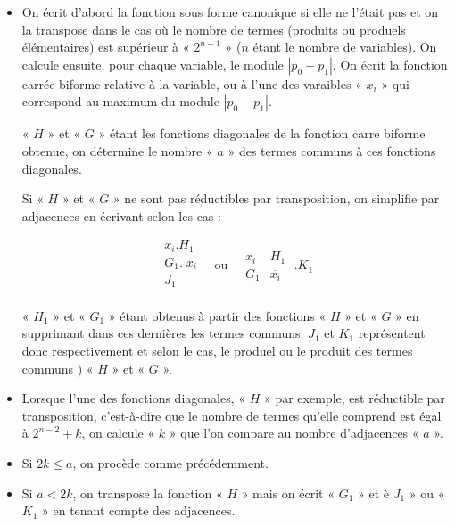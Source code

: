 \begin{itemize}
\item On écrit d'abord la fonction sous forme canonique si elle ne l'était pas et on la transpose dans le cas où le nombre de termes (produits ou produels élémentaires) est supérieur à « $2^{n-1}$ » ($n$ étant le nombre de variables). On calcule ensuite, pour chaque variable, le module $|p_0 - p_1|$. On écrit la fonction carrée biforme relative à la variable, ou à l'une des varaibles « $x_i$ » qui correspond au maximum du module $|p_0 - p_1|$.

« $H$ » et « $G$ » étant les fonctions diagonales de la fonction carre biforme obtenue, on détermine le nombre « $a$ » des termes communs à ces fonctions diagonales. 

Si « $H$ » et « $G$ » ne sont pas réductibles par transposition, on simplifie par adjacences en écrivant selon les cas : 



\[
\begin{array}{|c|} x_i . H_1 \\ G_1 . \; \overline{x_i} \\ J_1   \\    \end{array} \quad 
      \text{ou} \quad \begin{array}{|c|c|} x_i & H_1 \\ G_1 & \overline{x_i} \end{array} \; . K_1 
\]




« $H_1$ » et « $G_1$ » étant obtenus à partir des fonctions « $H$ » et « $G$ » en supprimant dans ces dernières les termes communs. $J_1$ et $K_1$ représentent donc respectivement et selon le cas, le produel ou le produit des termes communs ) « $H$ » et « $G$ ».

\item Lorsque l'une des fonctions diagonales, « $H$ » par exemple, est réductible par transposition, c'est-à-dire que le nombre de termes qu'elle comprend est égal à $2^{n-2} +k$, on calcule « $k$ » que l'on compare au nombre d'adjacences « $a$ ».

\item Si $2k \leqslant a$, on procède comme précédemment.

\item Si $a < 2k$, on transpose la fonction « $H$ » mais on écrit « $G_1$ » et è $J_1$ » ou « $K_1$ » en tenant compte des adjacences.


\end{itemize} 

